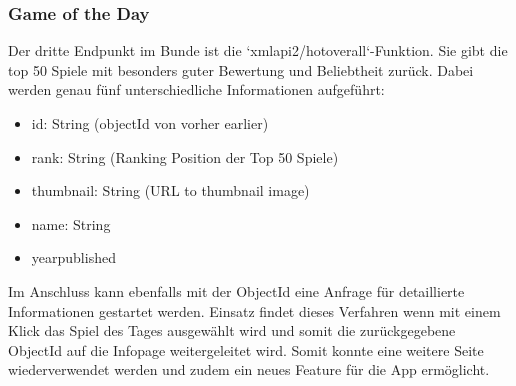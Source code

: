 \subsubsection{Game of the Day}
Der dritte Endpunkt im Bunde ist die `xmlapi2/hotoverall`-Funktion. Sie gibt die top 50 Spiele mit besonders guter Bewertung und Beliebtheit zurück.
Dabei werden genau fünf unterschiedliche Informationen aufgeführt:
\setlength{\itemsep}{-1pt}
\setlength{\parskip}{-1pt}
\begin{itemize}
    \item id: String (objectId von vorher earlier)
    \item rank: String (Ranking Position der Top 50 Spiele)
    \item thumbnail: String (URL to thumbnail image)
    \item name:  String        
    \item yearpublished 
\end{itemize}
Im Anschluss kann ebenfalls mit der ObjectId eine Anfrage für detaillierte Informationen gestartet werden. 
Einsatz findet dieses Verfahren wenn mit einem Klick das Spiel des Tages ausgewählt wird und somit die zurückgegebene ObjectId auf die Infopage
weitergeleitet wird. Somit konnte eine weitere Seite wiederverwendet werden und zudem ein neues Feature für die App ermöglicht. 
